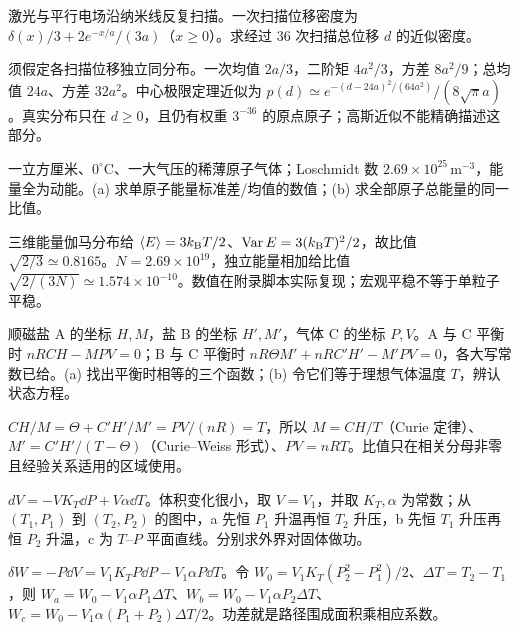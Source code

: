 \begin{exercise}
激光与平行电场沿纳米线反复扫描。一次扫描位移密度为 $\delta(x)/3+2e^{-x/a}/(3a)$（$x\ge0$）。求经过 36 次扫描总位移 $d$ 的近似密度。
\end{exercise}
\begin{solution}
须假定各扫描位移独立同分布。一次均值 $2a/3$，二阶矩 $4a^2/3$，方差 $8a^2/9$；总均值 $24a$、方差 $32a^2$。中心极限定理近似为 $p(d)\simeq e^{-(d-24a)^2/(64a^2)}/(8\sqrt\pi a)$。真实分布只在 $d\ge0$，且仍有权重 $3^{-36}$ 的原点原子；高斯近似不能精确描述这部分。
\end{solution}
\begin{exercise}
一立方厘米、$0^\circ$C、一大气压的稀薄原子气体；Loschmidt 数 $2.69\times10^{25}\,\mathrm{m}^{-3}$，能量全为动能。(a) 求单原子能量标准差/均值的数值；(b) 求全部原子总能量的同一比值。
\end{exercise}
\begin{solution}
三维能量伽马分布给 $\langle E\rangle=3k_{\mathrm B} T/2$、$\operatorname{Var} E=3(k_{\mathrm B} T)^2/2$，故比值 $\sqrt{2/3}\simeq0.8165$。$N=2.69\times10^{19}$，独立能量相加给比值 $\sqrt{2/(3N)}\simeq1.574\times10^{-10}$。数值在附录脚本实际复现；宏观平稳不等于单粒子平稳。
\end{solution}
\begin{exercise}
顺磁盐 A 的坐标 $H,M$，盐 B 的坐标 $H',M'$，气体 C 的坐标 $P,V$。A 与 C 平衡时 $nRCH-MPV=0$；B 与 C 平衡时 $nR\Theta M'+nRC'H'-M'PV=0$，各大写常数已给。(a) 找出平衡时相等的三个函数；(b) 令它们等于理想气体温度 $T$，辨认状态方程。
\end{exercise}
\begin{solution}
$CH/M=\Theta+C'H'/M'=PV/(nR)=T$，所以 $M=CH/T$（Curie 定律）、$M'=C'H'/(T-\Theta)$（Curie--Weiss 形式）、$PV=nRT$。比值只在相关分母非零且经验关系适用的区域使用。
\end{solution}
\begin{exercise}
$dV=-V K_T\dd P+V\alpha\dd T$。体积变化很小，取 $V=V_1$，并取 $K_T,\alpha$ 为常数；从 $(T_1,P_1)$ 到 $(T_2,P_2)$ 的图中，a 先恒 $P_1$ 升温再恒 $T_2$ 升压，b 先恒 $T_1$ 升压再恒 $P_2$ 升温，c 为 $T$--$P$ 平面直线。分别求外界对固体做功。
\end{exercise}
\begin{solution}
$\delta W=-P\dd V=V_1K_TP\dd P-V_1\alpha P\dd T$。令 $W_0=V_1K_T(P_2^2-P_1^2)/2$、$\Delta T=T_2-T_1$，则 $W_a=W_0-V_1\alpha P_1\Delta T$、$W_b=W_0-V_1\alpha P_2\Delta T$、$W_c=W_0-V_1\alpha(P_1+P_2)\Delta T/2$。功差就是路径围成面积乘相应系数。
\end{solution}
